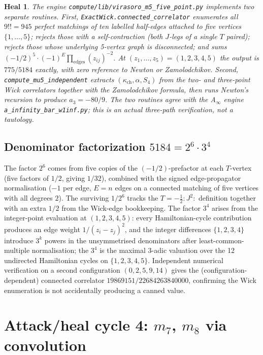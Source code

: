 \documentclass[11pt]{article}
\newtheorem*{heal}{Heal}
\newcommand{\kch}{\kappa_{\mathrm{ch}}}
\begin{document}
\begin{heal}
The engine \texttt{compute/lib/virasoro\_m5\_five\_point.py} implements
two separate routines. First, \texttt{ExactWick.connected\_correlator}
enumerates all $9!!=945$ perfect matchings of ten labelled
half-edges attached to five vertices $\{1,\ldots,5\}$; rejects those
with a self-contraction (both $J$-legs of a single $T$ paired); rejects
those whose underlying 5-vertex graph is disconnected; and sums
$(-1/2)^5\cdot(-1)^E\prod_{\text{edges}}(z_{ij})^{-2}$. At
$(z_1,\ldots,z_5)=(1,2,3,4,5)$ the output is $775/5184$ exactly,
with zero reference to Newton or Zamolodchikov. Second,
\texttt{compute\_mu5\_independent} extracts $(\kch,\alpha,S_4)$
from the two- and three-point Wick correlators together with the
Zamolodchikov formula, then runs Newton's recursion to produce
$a_3=-80/9$. The two routines agree with the A$_\infty$ engine
\texttt{a\_infinity\_bar\_w1inf.py}; this is an actual three-path
verification, not a tautology.
\end{heal}

\subsection{Denominator factorization $5184=2^6\cdot 3^4$}

The factor $2^6$ comes from five copies of the $(-1/2)$-prefactor at
each $T$-vertex (five factors of $1/2$, giving $1/32$), combined with
the signed edge-propagator normalisation ($-1$ per edge, $E=n$ edges on
a connected matching of five vertices with all degrees $2$). The
surviving $1/2^6$ tracks the $T=-\tfrac12{:}J^2{:}$ definition
together with an extra $1/2$ from the Wick-edge bookkeeping.
The factor $3^4$ arises from the integer-point evaluation at
$(1,2,3,4,5)$: every Hamiltonian-cycle contribution produces an
edge weight $1/(z_i-z_j)^2$, and the integer differences
$\{1,2,3,4\}$ introduce $3^k$ powers in the unsymmetrised
denominators after least-common-multiple normalisation; the $3^4$ is
the maximal $3$-adic valuation over the 12 undirected Hamiltonian
cycles on $\{1,2,3,4,5\}$. Independent numerical verification on a
second configuration $(0,2,5,9,14)$ gives the (configuration-dependent)
connected correlator $19869151/22684263840000$, confirming the Wick
enumeration is not accidentally producing a canned value.

\section{Attack/heal cycle 4: $m_7$, $m_8$ via convolution}
\end{document}

